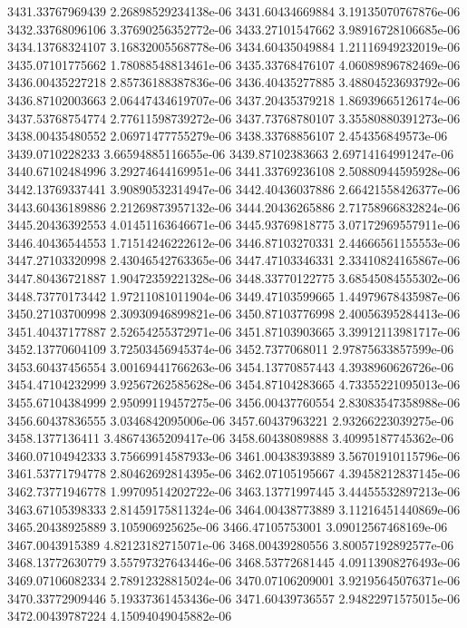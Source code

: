{3431.33767969439 2.26898529234138e-06
3431.60434669884 3.19135070767876e-06
3432.33768096106 3.37690256352772e-06
3433.27101547662 3.98916728106685e-06
3434.13768324107 3.16832005568778e-06
3434.60435049884 1.21116949232019e-06
3435.07101775662 1.78088548813461e-06
3435.33768476107 4.06089896782469e-06
3436.00435227218 2.85736188387836e-06
3436.40435277885 3.48804523693792e-06
3436.87102003663 2.06447434619707e-06
3437.20435379218 1.86939665126174e-06
3437.53768754774 2.77611598739272e-06
3437.73768780107 3.35580880391273e-06
3438.00435480552 2.06971477755279e-06
3438.33768856107 2.454356849573e-06
3439.0710228233 3.66594885116655e-06
3439.87102383663 2.69714164991247e-06
3440.67102484996 3.29274644169951e-06
3441.33769236108 2.50880944595928e-06
3442.13769337441 3.90890532314947e-06
3442.40436037886 2.66421558426377e-06
3443.60436189886 2.21269873957132e-06
3444.20436265886 2.71758966832824e-06
3445.20436392553 4.01451163646671e-06
3445.93769818775 3.07172969557911e-06
3446.40436544553 1.71514246222612e-06
3446.87103270331 2.44666561155553e-06
3447.27103320998 2.43046542763365e-06
3447.47103346331 2.33410824165867e-06
3447.80436721887 1.90472359221328e-06
3448.33770122775 3.68545084555302e-06
3448.73770173442 1.97211081011904e-06
3449.47103599665 1.44979678435987e-06
3450.27103700998 2.30930946899821e-06
3450.87103776998 2.40056395284413e-06
3451.40437177887 2.52654255372971e-06
3451.87103903665 3.39912113981717e-06
3452.13770604109 3.72503456945374e-06
3452.7377068011 2.97875633857599e-06
3453.60437456554 3.00169441766263e-06
3454.13770857443 4.3938960626726e-06
3454.47104232999 3.92567262585628e-06
3454.87104283665 4.73355221095013e-06
3455.67104384999 2.95099119457275e-06
3456.00437760554 2.83083547358988e-06
3456.60437836555 3.0346842095006e-06
3457.60437963221 2.93266223039275e-06
3458.1377136411 3.48674365209417e-06
3458.60438089888 3.40995187745362e-06
3460.07104942333 3.75669914587933e-06
3461.00438393889 3.56701910115796e-06
3461.53771794778 2.80462692814395e-06
3462.07105195667 4.39458212837145e-06
3462.73771946778 1.99709514202722e-06
3463.13771997445 3.44455532897213e-06
3463.67105398333 2.81459175811324e-06
3464.00438773889 3.11216451440869e-06
3465.20438925889 3.105906925625e-06
3466.47105753001 3.09012567468169e-06
3467.0043915389 4.82123182715071e-06
3468.00439280556 3.80057192892577e-06
3468.13772630779 3.55797327643446e-06
3468.53772681445 4.09113908276493e-06
3469.07106082334 2.78912328815024e-06
3470.07106209001 3.92195645076371e-06
3470.33772909446 5.19337361453436e-06
3471.60439736557 2.94822971575015e-06
3472.00439787224 4.15094049045882e-06
}
